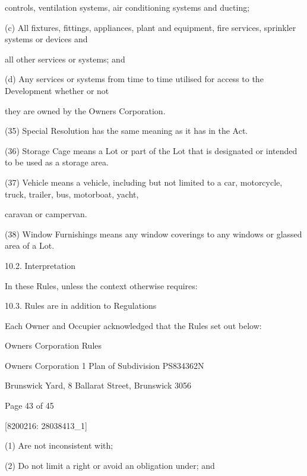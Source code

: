 \documentclass{article}
\begin{document}
{\fontsize{10.02}{1}controls, ventilation systems, air conditioning systems and ducting; }

{\fontsize{9.962}{1}(c) All fixtures, fittings, appliances, plant and equipment, fire services, sprinkler systems or devices and }

{\fontsize{10.02}{1}all other services or systems; and }

{\fontsize{9.962}{1}(d) Any services or systems from time to time utilised for access to the Development whether or not }

{\fontsize{10.02}{1}they are owned by the Owners Corporation. }

{\fontsize{9.962}{1}(35) Special Resolution has the same meaning as it has in the Act. }

{\fontsize{9.962}{1}(36) Storage Cage means a Lot or part of the Lot that is designated or intended to be used as a storage area. }

{\fontsize{9.962}{1}(37) Vehicle means a vehicle, including but not limited to a car, motorcycle, truck, trailer, bus, motorboat, yacht, }

{\fontsize{10.02}{1}caravan or campervan. }

{\fontsize{9.962}{1}(38) Window Furnishings means any window coverings to any windows or glassed area of a Lot. }

{\fontsize{9.99}{1}10.2. Interpretation }

{\fontsize{10.02}{1}In these Rules, unless the context otherwise requires: }

{\fontsize{9.99}{1}10.3. Rules are in addition to Regulations }

{\fontsize{10.02}{1}Each Owner and Occupier acknowledged that the Rules set out below: }

\newpage





{\fontsize{9}{1}Owners Corporation Rules }

{\fontsize{9}{1}Owners Corporation 1 Plan of Subdivision PS834362N }

{\fontsize{9}{1}Brunswick Yard, 8 Ballarat Street, Brunswick 3056 }


{\fontsize{9}{1}Page 43  of 45 }



{\fontsize{7.02}{1}[8200216: 28038413\_1] }

{\fontsize{9.962}{1}(1) Are not inconsistent with; }

{\fontsize{9.962}{1}(2) Do not limit a right or avoid an obligation under; and }
\end{document}
